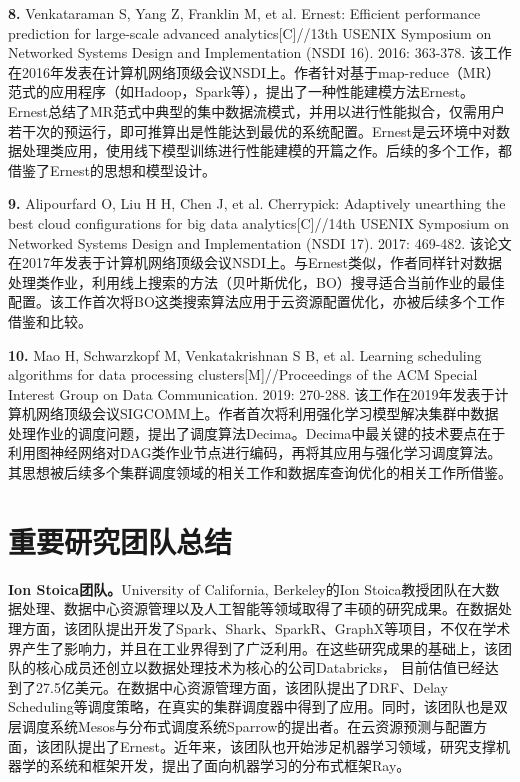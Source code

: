\textbf{8. }Venkataraman S, Yang Z, Franklin M, et al. Ernest: Efficient performance prediction for large-scale advanced analytics[C]//13th {USENIX} Symposium on Networked Systems Design and Implementation ({NSDI} 16). 2016: 363-378. 该工作在2016年发表在计算机网络顶级会议NSDI上。作者针对基于map-reduce（MR）范式的应用程序（如Hadoop，Spark等），提出了一种性能建模方法Ernest。Ernest总结了MR范式中典型的集中数据流模式，并用以进行性能拟合，仅需用户若干次的预运行，即可推算出是性能达到最优的系统配置。Ernest是云环境中对数据处理类应用，使用线下模型训练进行性能建模的开篇之作。后续的多个工作\parencite{yadwadkar2017selecting,klimovic2018selecta,moradi2019performance,zheng2019online}，都借鉴了Ernest的思想和模型设计。

\textbf{9. }Alipourfard O, Liu H H, Chen J, et al. Cherrypick: Adaptively unearthing the best cloud configurations for big data analytics[C]//14th {USENIX} Symposium on Networked Systems Design and Implementation ({NSDI} 17). 2017: 469-482. 该论文在2017年发表于计算机网络顶级会议NSDI上。与Ernest类似，作者同样针对数据处理类作业，利用线上搜索的方法（贝叶斯优化，BO）搜寻适合当前作业的最佳配置。该工作首次将BO这类搜索算法应用于云资源配置优化，亦被后续多个工作\parencite{casimiro2019lynceus,klimovic2018pocket,zhang2017slaq,hsu2018arrow,zhang2018awstream}借鉴和比较。

\textbf{10. }Mao H, Schwarzkopf M, Venkatakrishnan S B, et al. Learning scheduling algorithms for data processing clusters[M]//Proceedings of the ACM Special Interest Group on Data Communication. 2019: 270-288. 该工作在2019年发表于计算机网络顶级会议SIGCOMM上。作者首次将利用强化学习模型解决集群中数据处理作业的调度问题，提出了调度算法Decima。Decima中最关键的技术要点在于利用图神经网络对DAG类作业节点进行编码，再将其应用与强化学习调度算法。其思想被后续多个集群调度领域的相关工作和数据库查询优化的相关工作\parencite{47669,marcus2019neo,dwivedi2020benchmarking,narayanan2020heterogeneity,amaro2020can,cen2020learned,meng2020interpreting}所借鉴。


\section{重要研究团队总结}
\textbf{Ion Stoica团队。}University of California, Berkeley的Ion Stoica教授团队在大数据处理、数据中心资源管理以及人工智能等领域取得了丰硕的研究成果。在数据处理方面，该团队提出开发了Spark\parencite{zaharia2012resilient}、Shark、SparkR\parencite{venkataraman2016sparkr}、GraphX\parencite{gonzalez2014graphx}等项目，不仅在学术界产生了影响力，并且在工业界得到了广泛利用。在这些研究成果的基础上，该团队的核心成员还创立以数据处理技术为核心的公司Databricks， 目前估值已经达到了27.5亿美元。在数据中心资源管理方面，该团队提出了DRF、Delay Scheduling等调度策略，在真实的集群调度器中得到了应用。同时，该团队也是双层调度系统Mesos\parencite{hindman2011mesos}与分布式调度系统Sparrow\parencite{ousterhout2013sparrow}的提出者。在云资源预测与配置方面，该团队提出了Ernest。近年来，该团队也开始涉足机器学习领域，研究支撑机器学的系统和框架开发，提出了面向机器学习的分布式框架Ray。

